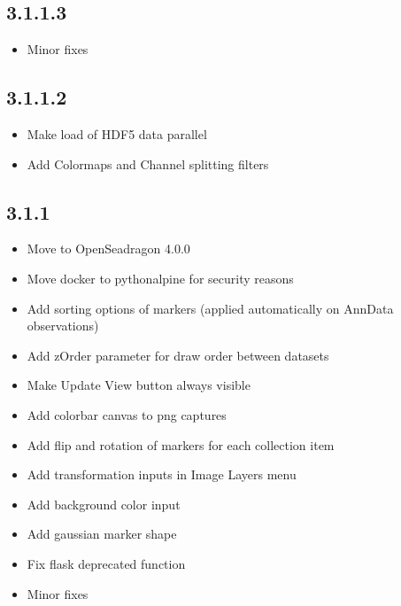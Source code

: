 \documentclass[letterpaper,10pt,english,openany,oneside]{sphinxmanual}
\begin{document}
\subsection{3.1.1.3}
\label{\detokenize{docs/intro/versions:id13}}\begin{itemize}
\item {} 
\sphinxAtStartPar
Minor fixes

\end{itemize}


\subsection{3.1.1.2}
\label{\detokenize{docs/intro/versions:id14}}\begin{itemize}
\item {} 
\sphinxAtStartPar
Make load of HDF5 data parallel

\item {} 
\sphinxAtStartPar
Add Colormaps and Channel splitting filters

\end{itemize}


\subsection{3.1.1}
\label{\detokenize{docs/intro/versions:id15}}\begin{itemize}
\item {} 
\sphinxAtStartPar
Move to OpenSeadragon 4.0.0

\item {} 
\sphinxAtStartPar
Move docker to python\sphinxhyphen{}alpine for security reasons

\item {} 
\sphinxAtStartPar
Add sorting options of markers (applied automatically on AnnData observations)

\item {} 
\sphinxAtStartPar
Add zOrder parameter for draw order between datasets

\item {} 
\sphinxAtStartPar
Make Update View button always visible

\item {} 
\sphinxAtStartPar
Add colorbar canvas to png captures

\item {} 
\sphinxAtStartPar
Add flip and rotation of markers for each collection item

\item {} 
\sphinxAtStartPar
Add transformation inputs in Image Layers menu

\item {} 
\sphinxAtStartPar
Add background color input

\item {} 
\sphinxAtStartPar
Add gaussian marker shape

\item {} 
\sphinxAtStartPar
Fix flask deprecated function

\item {} 
\sphinxAtStartPar
Minor fixes

\end{itemize}
\end{document}
